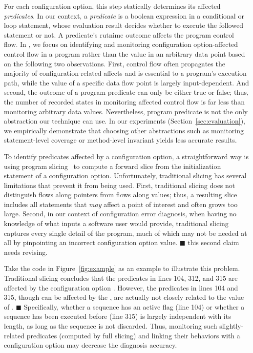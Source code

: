 For each configuration option, this step statically determines
its affected \textit{predicates}. In our context, a \textit{predicate}
is a boolean expression in a conditional or loop statement, whose evaluation result
decides whether to execute the followed statement or not.
A predicate's rutnime outcome affects the program control flow.
In \ourtool, we focus on identifying and monitoring 
configuration option-affected control flow in a program
rather than the value in an arbitrary data point based on the
following two observations. First, control flow 
often propagates the majority of configuration-related affects
and is essential to a program's execution path, while
the value of a specific data flow point is largely input-dependent.
And second, the outcome of a program predicate can only be
either true or false; thus, the number of recorded states in monitoring
affected control flow is far less than monitoring arbitrary
data values.  Nevertheless, program predicate is not the only
abstraction our technique can use. In our experiments (Section~\ref{sec:evaluation}),
we empirically demonstrate that choosing other abstractions
such as monitoring statement-level coverage
or method-level invariant yields less accurate results.


To identify predicates affected by a configuration option, a straightforward
way is using program slicing~\cite{Horwitz:1988} to compute
a forward slice from the initialization statement of a
configuration option. Unfortunately, traditional slicing has
several limitations that prevent it from being used.
First, traditional slicing does not distinguish flows along
pointers from flows along values; thus, a resulting slice includes all statements that
\textit{may} affect a point of interest and often grows too large. Second,
in our context of configuration error diagnosis,
when having no knowledge of what inputs a software user would provide,
traditional slicing captures every single detail of the program,
much of which may not be needed at all by pinpointing an incorrect
configuration option value. $\blacksquare$ this second claim needs revising.

Take the code in Figure~\ref{fig:example} as an example to illustrate
this problem.  Traditional slicing concludes that the predicates
in lines 104, 312, and 315 are affected by the configuration option .
However, the predicates in lines 104 and 315, though can be
affected by the , are actually not closely related
to the value of . $\blacksquare$
Specifically, whether a sequence has an active flag (line 104) or
whether a sequence has been executed before (line 315)
is largely independent with its length, as long as the
sequence is not discarded. Thus, monitoring
such slightly-related predicates (computed by full slicing) and linking their behaviors with a
configuration option may decrease the diagnosis accuracy.

